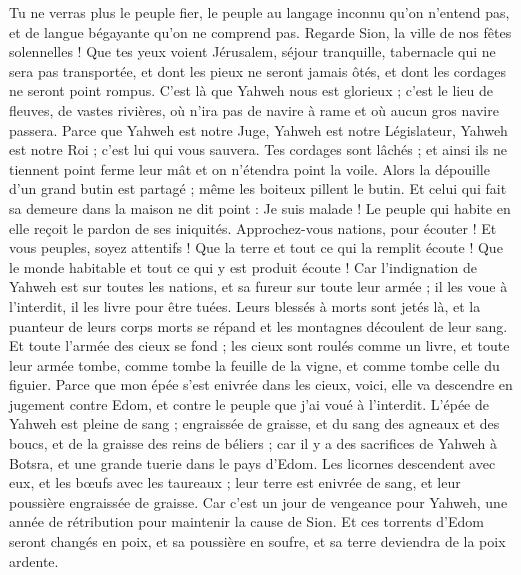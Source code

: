 \begin{multicols}{2}
Tu ne verras plus le peuple fier, le peuple au langage inconnu qu'on n'entend pas, et de langue bégayante qu'on ne comprend pas.
Regarde Sion, la ville de nos fêtes solennelles ! Que tes yeux voient Jérusalem, séjour tranquille, tabernacle qui ne sera pas transportée, et dont les pieux ne seront jamais ôtés, et dont les cordages ne seront point rompus.
C'est là que Yahweh nous est glorieux ; c'est le lieu de fleuves, de vastes rivières, où n'ira pas de navire à rame et où aucun gros navire passera.
Parce que Yahweh est notre Juge, Yahweh est notre Législateur, Yahweh est notre Roi ; c'est lui qui vous sauvera.
Tes cordages sont lâchés ; et ainsi ils ne tiennent point ferme leur mât et on n'étendra point la voile. Alors la dépouille d'un grand butin est partagé ; même les boiteux pillent le butin.
Et celui qui fait sa demeure dans la maison ne dit point : Je suis malade ! Le peuple qui habite en elle reçoit le pardon de ses iniquités.
\VerseOne{}Approchez-vous nations, pour écouter ! Et vous peuples, soyez attentifs ! Que la terre et tout ce qui la remplit écoute ! Que le monde habitable et tout ce qui y est produit écoute !
Car l'indignation de Yahweh est sur toutes les nations, et sa fureur sur toute leur armée ; il les voue à l'interdit, il les livre pour être tuées.
Leurs blessés à morts sont jetés là, et la puanteur de leurs corps morts se répand et les montagnes découlent de leur sang.
Et toute l'armée des cieux se fond ; les cieux sont roulés comme un livre, et toute leur armée tombe, comme tombe la feuille de la vigne, et comme tombe celle du figuier.
Parce que mon épée s'est enivrée dans les cieux, voici, elle va descendre en jugement contre Edom, et contre le peuple que j'ai voué à l'interdit.
L'épée de Yahweh est pleine de sang ; engraissée de graisse, et du sang des agneaux et des boucs, et de la graisse des reins de béliers ; car il y a des sacrifices de Yahweh à Botsra, et une grande tuerie dans le pays d'Edom.
Les licornes descendent avec eux, et les bœufs avec les taureaux ; leur terre est enivrée de sang, et leur poussière engraissée de graisse.
Car c'est un jour de vengeance pour Yahweh, une année de rétribution pour maintenir la cause de Sion.
Et ces torrents d'Edom seront changés en poix, et sa poussière en soufre, et sa terre deviendra de la poix ardente.

\end{multicols}
